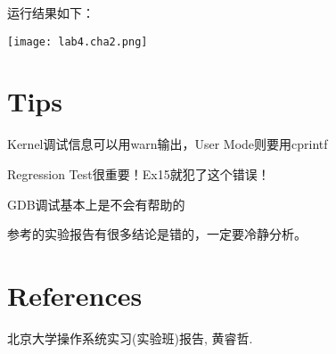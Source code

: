 \documentclass[11pt]{article}
\newenvironment{packed_enum}{
\begin{enumerate}
  \setlength{\itemsep}{1pt}
  \setlength{\parskip}{0pt}
  \setlength{\parsep}{0pt}
}{\end{enumerate}}
\begin{document}
运行结果如下：
\begin{center}
\texttt{[image: lab4.cha2.png]}
\end{center}

\section{Tips}
\begin{packed_enum}
\item Kernel调试信息可以用warn输出，User Mode则要用cprintf
\item Regression Test很重要！Ex15就犯了这个错误！
\item GDB调试基本上是不会有帮助的
\item 参考的实验报告有很多结论是错的，一定要冷静分析。
\end{packed_enum}

\section{References}
北京大学操作系统实习(实验班)报告, 黄睿哲.
\end{document}
